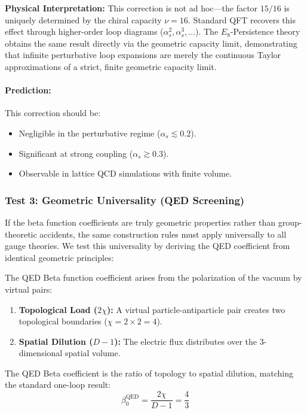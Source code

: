 \textbf{Physical Interpretation:} This correction is not ad hoc—the factor $15/16$ is uniquely determined by the chiral capacity $\nu=16$. Standard QFT recovers this effect through higher-order loop diagrams ($\alpha_s^2, \alpha_s^3, \ldots$). The $E_8$-Persistence theory obtains the same result directly via the geometric capacity limit, demonstrating that infinite perturbative loop expansions are merely the continuous Taylor approximations of a strict, finite geometric capacity limit.

\paragraph{Prediction:} This correction should be:
\begin{itemize}
    \item Negligible in the perturbative regime ($\alpha_s \lesssim 0.2$).
    \item Significant at strong coupling ($\alpha_s \gtrsim 0.3$).
    \item Observable in lattice QCD simulations with finite volume.
\end{itemize}




\subsubsection{Test 3: Geometric Universality (QED Screening)}
If the beta function coefficients are truly geometric properties rather than group-theoretic accidents, the same construction rules must apply universally to all gauge theories. We test this universality by deriving the QED coefficient from identical geometric principles:

The QED Beta function coefficient arises from the polarization of the vacuum by virtual pairs:
\begin{enumerate}
    \item \textbf{Topological Load ($2\chi$):} A virtual particle-antiparticle pair creates two topological boundaries ($\chi=2 \times 2 = 4$).
    \item \textbf{Spatial Dilution ($D-1$):} The electric flux distributes over the 3-dimensional spatial volume.
\end{enumerate}

The QED Beta coefficient is the ratio of topology to spatial dilution, matching the standard one-loop result:
\begin{equation}
    \beta_0^{\text{QED}} = \frac{2\chi}{D-1} = \frac{4}{3}
\end{equation}

